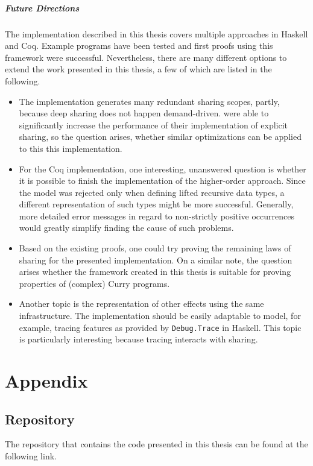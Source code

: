 \documentclass[a4paper, 11pt, fleqn, twoside, abstract=on]{scrreprt}
\newcommand{\hinl}[1]{\texttt{#1}}
\begin{document}
\paragraph{Future Directions}
The implementation described in this thesis covers multiple approaches in Haskell and Coq.
Example programs have been tested and first proofs using this framework were successful.
Nevertheless, there are many different options to extend the work presented in this thesis,
a few of which are listed in the following.
\begin{itemize}
\item The implementation generates many redundant sharing scopes, partly, because deep sharing does not happen demand-driven.
      \citet{fischer2009purely} were able to significantly increase the performance of their implementation of explicit sharing, so the question arises, whether similar optimizations can be applied to this this implementation.
\item For the Coq implementation, one interesting, unanswered question is whether it is possible to finish the implementation of the higher-order approach.
      Since the model was rejected only when defining lifted recursive data types, a different representation of such types might be more successful.
      Generally, more detailed error messages in regard to non-strictly positive occurrences would greatly simplify finding the cause of such problems.
\item Based on the existing proofs, one could try proving the remaining laws of sharing for the presented implementation. On a similar note, the question arises whether the framework created in this thesis is suitable for proving properties of (complex) Curry programs.
\item Another topic is the representation of other effects using the same infrastructure.
      The implementation should be easily adaptable to model, for example, tracing features as provided by \hinl{Debug.Trace} in Haskell.
      This topic is particularly interesting because tracing interacts with sharing.
\end{itemize}







\appendix
\chapter{Appendix}
\section{Repository}
The repository that contains the code presented in this thesis can be found at the following link.
\end{document}
